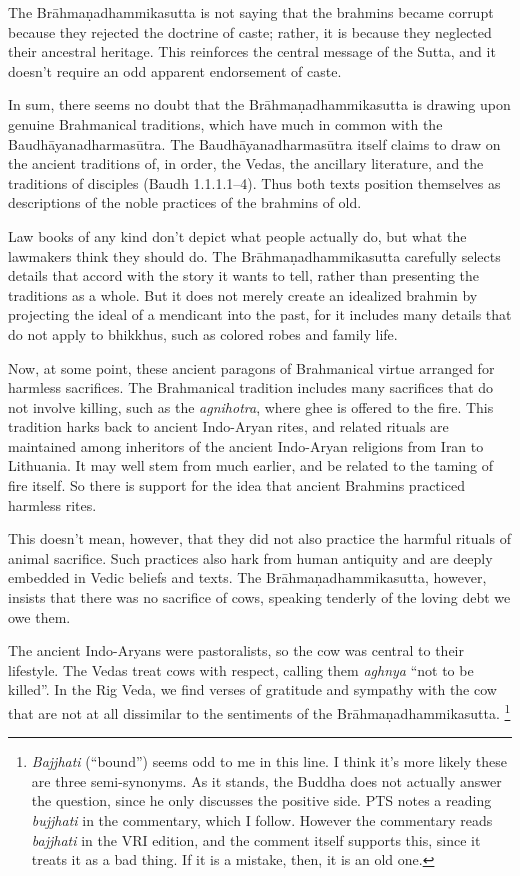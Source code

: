 \documentclass[12pt,openany]{book}%
\begin{document}
The \textsanskrit{Brāhmaṇadhammikasutta} is not saying that the brahmins became corrupt because they rejected the doctrine of caste; rather, it is because they neglected their ancestral heritage. This reinforces the central message of the Sutta, and it doesn’t require an odd apparent endorsement of caste.

In sum, there seems no doubt that the \textsanskrit{Brāhmaṇadhammikasutta} is drawing upon genuine Brahmanical traditions, which have much in common with the \textsanskrit{Baudhāyanadharmasūtra}. The \textsanskrit{Baudhāyanadharmasūtra} itself claims to draw on the ancient traditions of, in order, the Vedas, the ancillary literature, and the traditions of disciples (Baudh 1.1.1.1–4). Thus both texts position themselves as descriptions of the noble practices of the brahmins of old.

Law books of any kind don’t depict what people actually do, but what the lawmakers think they should do. The \textsanskrit{Brāhmaṇadhammikasutta} carefully selects details that accord with the story it wants to tell, rather than presenting the traditions as a whole. But it does not merely create an idealized brahmin by projecting the ideal of a mendicant into the past, for it includes many details that do not apply to bhikkhus, such as colored robes and family life.

Now, at some point, these ancient paragons of Brahmanical virtue arranged for harmless sacrifices. The Brahmanical tradition includes many sacrifices that do not involve killing, such as the \textit{agnihotra}, where ghee is offered to the fire. This tradition harks back to ancient Indo-Aryan rites, and related rituals are maintained among inheritors of the ancient Indo-Aryan religions from Iran to Lithuania. It may well stem from much earlier, and be related to the taming of fire itself. So there is support for the idea that ancient Brahmins practiced harmless rites.

This doesn’t mean, however, that they did not also practice the harmful rituals of animal sacrifice. Such practices also hark from human antiquity and are deeply embedded in Vedic beliefs and texts. The \textsanskrit{Brāhmaṇadhammikasutta}, however, insists that there was no sacrifice of cows, speaking tenderly of the loving debt we owe them.

The ancient Indo-Aryans were pastoralists, so the cow was central to their lifestyle. The Vedas treat cows with respect, calling them \textit{aghnya} “not to be killed”. In the Rig Veda, we find verses of gratitude and sympathy with the cow that are not at all dissimilar to the sentiments of the \textsanskrit{Brāhmaṇadhammikasutta}. \footnote{\textit{Bajjhati} (“bound”) seems odd to me in this line. I think it’s more likely these are three semi-synonyms. As it stands, the Buddha does not actually answer the question, since he only discusses the positive side. PTS notes a reading \textit{bujjhati} in the commentary, which I follow. However the commentary reads \textit{bajjhati} in the VRI edition, and the comment itself supports this, since it treats it as a bad thing. If it is a mistake, then, it is an old one. }
\end{document}
